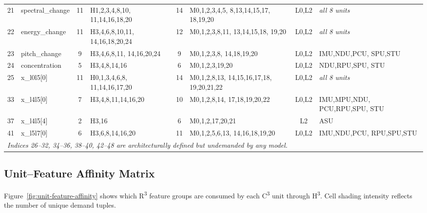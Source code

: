 {\begin{longtable}{@{}
  r
  >{\raggedright}p{2.1cm}
  c
  >{\raggedright}p{3.5cm}
  c
  >{\raggedright}p{3.0cm}
  c
  >{\raggedright\arraybackslash}p{2.8cm}
@{}}
\rowcolor{grpD}
21 & spectral\_change & 11 & H1,2,3,4,8,10, 11,14,16,18,20
   & 14 & M0,1,2,3,4,5, 8,13,14,15,17, 18,19,20 & L0,L2
   & \textit{all 8 units} \\
\rowcolor{grpD}
22 & energy\_change   & 11 & H3,4,6,8,10,11, 14,16,18,20,24
   & 12 & M0,1,2,3,8,11, 13,14,15,18, 19,20 & L0,L2
   & \textit{all 8 units} \\
\rowcolor{grpD}
23 & pitch\_change    &  9 & H3,4,6,8,11, 14,16,20,24
   & 9  & M0,1,2,3,8, 14,18,19,20 & L0,L2
   & IMU,NDU,PCU, SPU,STU \\
\rowcolor{grpD}
24 & concentration    &  5 & H3,4,8,14,16
   & 6  & M0,1,2,3,19,20 & L0,L2
   & NDU,RPU,SPU, STU \\

\rowcolor{grpE}
25 & x\_l0l5[0]       & 11 & H0,1,3,4,6,8, 11,14,16,17,20
   & 14 & M0,1,2,8,13, 14,15,16,17,18, 19,20,21,22 & L0,L2
   & \textit{all 8 units} \\
\rowcolor{grpE}
33 & x\_l4l5[0]       &  7 & H3,4,8,11,14,16,20
   & 10 & M0,1,2,8,14, 17,18,19,20,22 & L0,L2
   & IMU,MPU,NDU, PCU,RPU,SPU, STU \\
\rowcolor{grpE}
37 & x\_l4l5[4]       &  2 & H3,16
   & 6  & M0,1,2,17,20,21 & L2
   & ASU \\
\rowcolor{grpE}
41 & x\_l5l7[0]       &  6 & H3,6,8,14,16,20
   & 11 & M0,1,2,5,6,13, 14,16,18,19,20 & L0,L2
   & IMU,NDU,PCU, RPU,SPU,STU \\[3pt]
\multicolumn{8}{l}{\footnotesize\itshape
  Indices 26--32, 34--36, 38--40, 42--48 are architecturally defined
  but undemanded by any model.} \\

\end{longtable}
}%


\subsection{Unit--Feature Affinity Matrix}
\label{subsec:routing-affinity}

Figure~\ref{fig:unit-feature-affinity} shows which R\textsuperscript{3}
feature groups are consumed by each C\textsuperscript{3} unit through
H\textsuperscript{3}.  Cell shading intensity reflects the number of
unique demand tuples.

